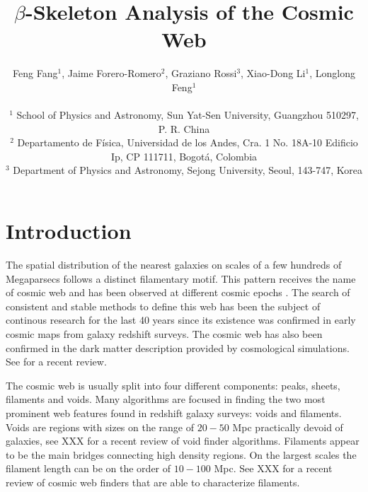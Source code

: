 \documentclass[useAMS,usenatbib]{mnras}
\begin{document}
\title[$\beta$-Skeleton Analysis]{$\beta$-Skeleton Analysis of the Cosmic Web}

\author[Fang, Forero-Romero, Rossi, Li \& Feng (2018)]
{Feng Fang$^1$, Jaime Forero-Romero$^2$, Graziano Rossi$^3$, Xiao-Dong Li$^1$, Longlong Feng$^1$ \\ \\
$^1$ School of Physics and Astronomy, Sun Yat-Sen University, Guangzhou 510297, P. R. China \\
$^2$ Departamento de F{\'i}sica, Universidad de los Andes, Cra. 1 No. 18A-10 Edificio Ip, CP 111711, Bogot{\'a}, Colombia \\
$^3$ Department of Physics and Astronomy, Sejong University, Seoul, 143-747, Korea}

\pagerange{\pageref{firstpage}--\pageref{lastpage}} 
\maketitle
\label{firstpage}


 

\section{Introduction}

The spatial distribution of the nearest galaxies on scales of a few
hundreds of Megaparsecs follows a distinct filamentary motif.
This pattern receives the name of cosmic web
\citep{1986ApJ...304...15B} and has been observed at
different cosmic epochs \citep{1986ApJ...302L...1D,
  2012ApJS..199...26H,2004ApJ...606..702T,2014A&A...566A.108G}.   
The search of consistent and stable methods to define this web has
been the subject of continous research for the last 40 years since its
existence was confirmed in early cosmic maps from galaxy redshift
surveys.
The cosmic web has also been confirmed in the dark matter description
provided by cosmological simulations.  
See \cite{2018MNRAS.473.1195L} for a recent review.


The cosmic web is usually split into four different components: peaks,
sheets, filaments and voids.
Many algorithms are focused in finding the two most prominent web features
found in redshift galaxy surveys: voids and filaments. 
Voids are regions with sizes on the range of $20-50$ Mpc
practically devoid of galaxies, see XXX for a recent review of
void finder algorithms.
Filaments appear to be the main bridges connecting high
density regions. 
On the largest scales the filament length can be on the order of
$10-100$ Mpc.
See XXX for a recent review of cosmic web finders that are able to
characterize filaments. 
\end{document}
